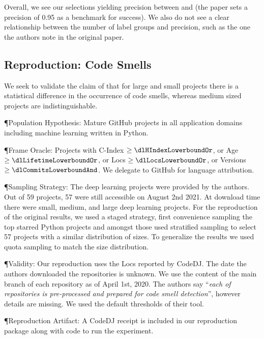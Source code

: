 \documentclass[sigconf,review,anonymous]{acmart}
\newcommand{\gh}{{GitHub}\xspace}
\renewcommand{\dj}{{\textsf{Code{\small{DJ}}}}\xspace}
\begin{document}
Overall, we see our selections yielding
precision between \SAMinPrecision and \SAMaxPrecision (the paper sets
a precision of 0.95 as a benchmark for success). We also do not see a clear
relationship between the number of label groups and precision, such as the one
the authors note in the original paper.

\newpage

\subsection{Reproduction: Code Smells}

We seek to validate the claim of \citet{Jebnoun:2020:MSR} that for large and
small projects there is a statistical difference in the occurrence of code
smells, whereas medium sized projects are indistinguishable.

\P{Population Hypothesis:} Mature \gh projects in all application domains
including machine learning written in Python.

\P{Frame Oracle:} Projects with C-Index $\geq \dlHIndexLowerboundOr$, or Age
$\geq \dlLifetimeLowerboundOr$, or Locs $\geq \dlLocsLowerboundOr$, or Versions
$\geq \dlCommitsLowerboundAnd$. We delegate to \gh for language attribution.


\P{Sampling Strategy:} The deep learning projects were provided by the authors.
Out of 59 projects, 57 were still accessible on August 2nd 2021. At download
time there were \countSmallDL small, \countMediumDL medium, and \countLargeDL
large deep learning projects. For the reproduction of the original results, we
used a staged strategy, first convenience sampling the top starred Python
projects and amongst those used stratified sampling to select 57 projects with a
similar distribution of sizes. To generalize the results we used quota sampling
to match the size distribution.

\P{Validity:} Our reproduction uses the Locs reported by \dj. The date the
authors downloaded the repositories is unknown. We use the content of the main
branch of each repository as of April 1st, 2020. The authors say ``\textit{each
  of repositories is pre-processed and prepared for code smell detection}'',
however details are missing. We used the default thresholds of their tool.

\P{Reproduction Artifact:} A \dj receipt is included in our reproduction package
along with code to run the experiment.
\end{document}
